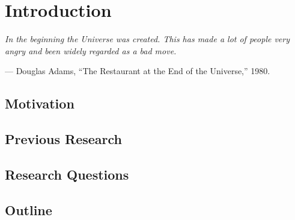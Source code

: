\chapter{Introduction}
\label{chap:introduction}

\setlength{\epigraphwidth}{0.5\textwidth}
\epigraph{ \it
    In the beginning the Universe was created.
    This has made a lot of people very angry and been widely regarded as a bad move.
}{--- Douglas Adams, ``The Restaurant at the End of the Universe,'' 1980.}

\section{Motivation}

\section{Previous Research}

\section{Research Questions}

\section{Outline}

